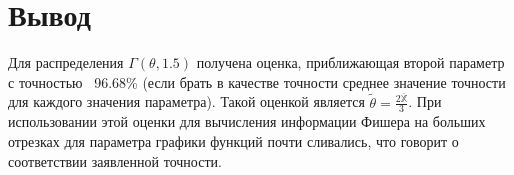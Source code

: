 \documentclass{article}
\begin{document}
    \section{Вывод}

    Для распределения $\Gamma(\theta, 1.5)$ получена оценка, приближающая второй параметр с точностью ~96.68\% (если брать в качестве точности среднее значение точности для каждого значения параметра). Такой оценкой является $\widetilde{\theta} = \frac{2\overline{\mathbb{X}}}{3}$. При использовании этой оценки для вычисления информации Фишера на больших отрезках для параметра графики функций почти сливались, что говорит о соответствии заявленной точности.
\end{document}
